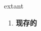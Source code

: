
\begin{frame}
{\huge extant}
\begin{center}
\begin{enumerate}\Large
  \item \textbf{现存的}
\end{enumerate}
\end{center}
\end{frame}
